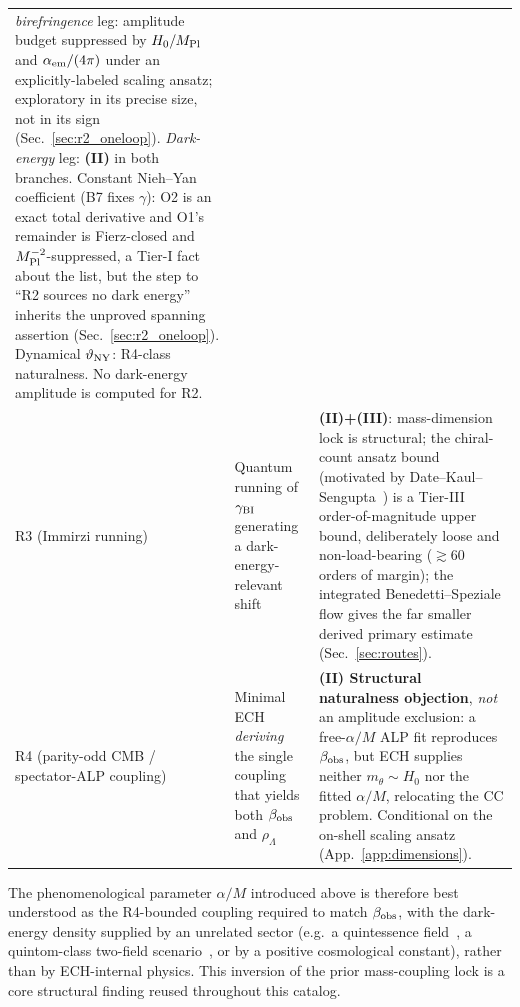 \documentclass[aps,prd,twocolumn,superscriptaddress,showpacs,preprintnumbers,nofootinbib,longbibliography,floatfix]{revtex4-2}
\begin{document}
\begin{table}[!tb]
\begin{ruledtabular}
\begin{tabular}{lll}
{\emph{birefringence} leg: amplitude
budget suppressed by $H_0/M_{\rm Pl}$ and $\alpha_{\rm em}/(4\pi)$ under an
explicitly-labeled scaling ansatz; exploratory in its precise size, not
in its sign (Sec.~\ref{sec:r2_oneloop}).
\emph{Dark-energy} leg: \textbf{(II)} in both branches. Constant
Nieh--Yan coefficient (B7 fixes $\gamma$): O2 is an exact total
derivative and O1's remainder is Fierz-closed and
$M_{\rm Pl}^{-2}$-suppressed, a Tier-I fact about the list,
but the step to ``R2 sources no dark energy'' inherits the unproved
spanning assertion (Sec.~\ref{sec:r2_oneloop}). Dynamical
$\vartheta_{\rm NY}$: R4-class naturalness. No dark-energy amplitude is
computed for R2.\strut}
\\[3pt]
\parbox[t]{0.18\textwidth}{\raggedright R3 (Immirzi running)\strut} &
\parbox[t]{0.40\textwidth}{\raggedright Quantum running of $\gamma_{\rm BI}$
generating a dark-energy-relevant shift\strut} &
\parbox[t]{0.32\textwidth}{\raggedright \textbf{(II)+(III)}: mass-dimension
lock is structural; the chiral-count ansatz bound (motivated by
Date--Kaul--Sengupta~\cite{DateKaulSengupta2009}) is a Tier-III
order-of-magnitude upper bound, deliberately loose and non-load-bearing
($\gtrsim 60$ orders of margin); the integrated Benedetti--Speziale flow
gives the far smaller derived primary estimate
(Sec.~\ref{sec:routes}).\strut} \\[3pt]
\parbox[t]{0.18\textwidth}{\raggedright R4 (parity-odd CMB / spectator-ALP
coupling)\strut} &
\parbox[t]{0.40\textwidth}{\raggedright Minimal ECH \emph{deriving} the single
coupling that yields both $\beta_{\rm obs}$ and $\rho_\Lambda$\strut} &
\parbox[t]{0.32\textwidth}{\raggedright \textbf{(II) Structural naturalness
objection}, \emph{not} an amplitude exclusion: a free-$\alpha/M$ ALP fit
reproduces $\beta_{\rm obs}$, but ECH supplies neither $m_\theta\!\sim\!H_0$
nor the fitted $\alpha/M$, relocating the CC problem. Conditional on the
on-shell scaling ansatz (App.~\ref{app:dimensions}).\strut} \\
\end{tabular}
\end{ruledtabular}
\end{table}

The phenomenological parameter $\alpha/M$ introduced above is therefore
best understood as the R4-bounded coupling required to
match $\beta_{\rm obs}$, with the dark-energy density supplied by an
unrelated sector (e.g.\ a quintessence field~\cite{Carroll1998}, a
quintom-class two-field scenario~\cite{Cai2010quintomReview}, or by a positive
cosmological constant), rather than by ECH-internal physics. This
inversion of the prior mass-coupling lock is a core structural
finding reused throughout this catalog.
\end{document}
